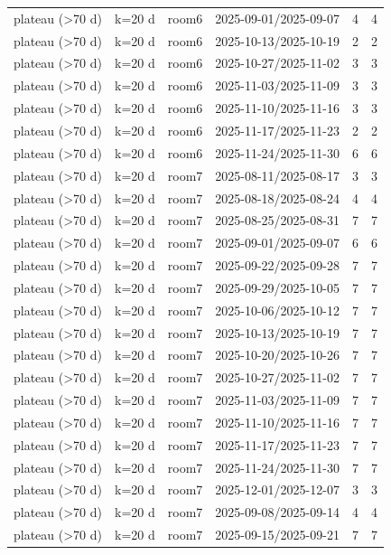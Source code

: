 \begin{tabular}{llllll}
plateau (>70 d) & k=20 d & room6 & 2025-09-01/2025-09-07 & 4 & 4 \\
plateau (>70 d) & k=20 d & room6 & 2025-10-13/2025-10-19 & 2 & 2 \\
plateau (>70 d) & k=20 d & room6 & 2025-10-27/2025-11-02 & 3 & 3 \\
plateau (>70 d) & k=20 d & room6 & 2025-11-03/2025-11-09 & 3 & 3 \\
plateau (>70 d) & k=20 d & room6 & 2025-11-10/2025-11-16 & 3 & 3 \\
plateau (>70 d) & k=20 d & room6 & 2025-11-17/2025-11-23 & 2 & 2 \\
plateau (>70 d) & k=20 d & room6 & 2025-11-24/2025-11-30 & 6 & 6 \\
plateau (>70 d) & k=20 d & room7 & 2025-08-11/2025-08-17 & 3 & 3 \\
plateau (>70 d) & k=20 d & room7 & 2025-08-18/2025-08-24 & 4 & 4 \\
plateau (>70 d) & k=20 d & room7 & 2025-08-25/2025-08-31 & 7 & 7 \\
plateau (>70 d) & k=20 d & room7 & 2025-09-01/2025-09-07 & 6 & 6 \\
plateau (>70 d) & k=20 d & room7 & 2025-09-22/2025-09-28 & 7 & 7 \\
plateau (>70 d) & k=20 d & room7 & 2025-09-29/2025-10-05 & 7 & 7 \\
plateau (>70 d) & k=20 d & room7 & 2025-10-06/2025-10-12 & 7 & 7 \\
plateau (>70 d) & k=20 d & room7 & 2025-10-13/2025-10-19 & 7 & 7 \\
plateau (>70 d) & k=20 d & room7 & 2025-10-20/2025-10-26 & 7 & 7 \\
plateau (>70 d) & k=20 d & room7 & 2025-10-27/2025-11-02 & 7 & 7 \\
plateau (>70 d) & k=20 d & room7 & 2025-11-03/2025-11-09 & 7 & 7 \\
plateau (>70 d) & k=20 d & room7 & 2025-11-10/2025-11-16 & 7 & 7 \\
plateau (>70 d) & k=20 d & room7 & 2025-11-17/2025-11-23 & 7 & 7 \\
plateau (>70 d) & k=20 d & room7 & 2025-11-24/2025-11-30 & 7 & 7 \\
plateau (>70 d) & k=20 d & room7 & 2025-12-01/2025-12-07 & 3 & 3 \\
plateau (>70 d) & k=20 d & room7 & 2025-09-08/2025-09-14 & 4 & 4 \\
plateau (>70 d) & k=20 d & room7 & 2025-09-15/2025-09-21 & 7 & 7 \\
\hline
\end{tabular}
